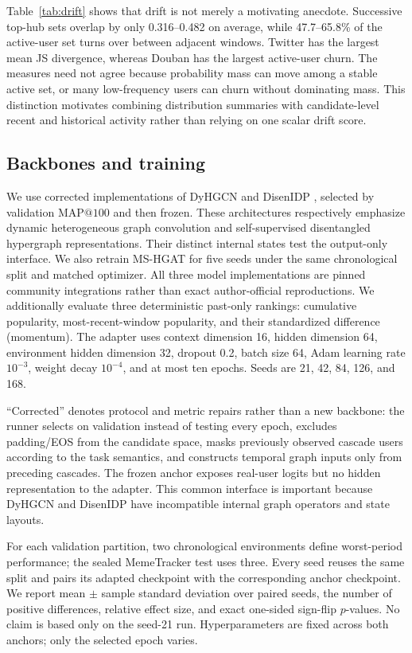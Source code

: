 \documentclass[sigconf,anonymous,review]{acmart}
\makeatletter
\newcommand{\mapk}{\mathrm{MAP}@100}
\makeatother
\begin{document}
Table~\ref{tab:drift} shows that drift is not merely a motivating anecdote. Successive top-hub sets overlap by only 0.316--0.482 on average, while 47.7--65.8\% of the active-user set turns over between adjacent windows. Twitter has the largest mean JS divergence, whereas Douban has the largest active-user churn. The measures need not agree because probability mass can move among a stable active set, or many low-frequency users can churn without dominating mass. This distinction motivates combining distribution summaries with candidate-level recent and historical activity rather than relying on one scalar drift score.

\subsection{Backbones and training}
We use corrected implementations of DyHGCN \cite{yuan2020dyhgcn} and DisenIDP \cite{cheng2023disenidp}, selected by validation $\mapk$ and then frozen. These architectures respectively emphasize dynamic heterogeneous graph convolution and self-supervised disentangled hypergraph representations. Their distinct internal states test the output-only interface. We also retrain MS-HGAT \cite{sun2022mshgat} for five seeds under the same chronological split and matched optimizer. All three model implementations are pinned community integrations rather than exact author-official reproductions. We additionally evaluate three deterministic past-only rankings: cumulative popularity, most-recent-window popularity, and their standardized difference (momentum). The adapter uses context dimension 16, hidden dimension 64, environment hidden dimension 32, dropout 0.2, batch size 64, Adam learning rate $10^{-3}$, weight decay $10^{-4}$, and at most ten epochs. Seeds are 21, 42, 84, 126, and 168.

``Corrected'' denotes protocol and metric repairs rather than a new backbone: the runner selects on validation instead of testing every epoch, excludes padding/EOS from the candidate space, masks previously observed cascade users according to the task semantics, and constructs temporal graph inputs only from preceding cascades. The frozen anchor exposes real-user logits but no hidden representation to the adapter. This common interface is important because DyHGCN and DisenIDP have incompatible internal graph operators and state layouts.

For each validation partition, two chronological environments define worst-period performance; the sealed MemeTracker test uses three. Every seed reuses the same split and pairs its adapted checkpoint with the corresponding anchor checkpoint. We report mean $\pm$ sample standard deviation over paired seeds, the number of positive differences, relative effect size, and exact one-sided sign-flip $p$-values. No claim is based only on the seed-21 run. Hyperparameters are fixed across both anchors; only the selected epoch varies.
\end{document}
